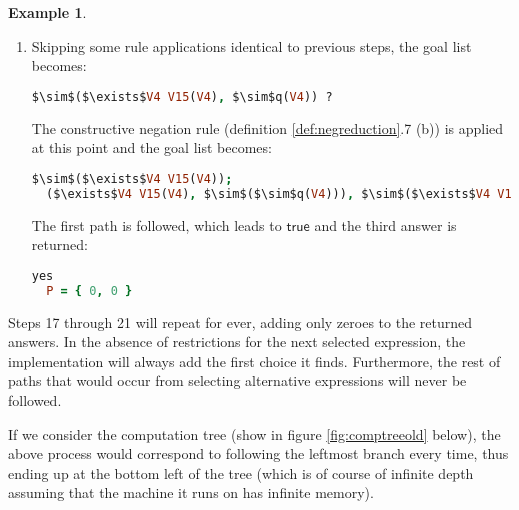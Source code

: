 \documentclass[inscr,ack,preface]{dithesis}
\theoremstyle{definition}
\newtheorem{example}{Example}[chapter]
\newcommand{\msf}[1]{$\mathsf{#1}$}
\begin{document}
\begin{example}
\begin{enumerate}
\item Skipping some rule applications identical to previous steps, the goal list becomes:
\begin{lstlisting}[language=Prolog,%
  frame=single,breaklines=false,mathescape=true]
$\sim$($\exists$V4 V15(V4), $\sim$q(V4)) ?
\end{lstlisting}

The constructive negation rule (definition \ref{def:negreduction}.7 (b)) is applied at this point and the goal list becomes:
\begin{lstlisting}[language=Prolog,%
  frame=single,breaklines=false,mathescape=true]
  $\sim$($\exists$V4 V15(V4));
  ($\exists$V4 V15(V4), $\sim$($\sim$q(V4))), $\sim$($\exists$V4 V15(V4), $\sim$q(V4)) ?
\end{lstlisting}

The first path is followed, which leads to \msf{true} and the third answer is returned:
\begin{lstlisting}[language=Prolog,%
  frame=single,breaklines=false,mathescape=true]
  yes
  P = { 0, 0 }
\end{lstlisting}
\end{enumerate}

Steps 17 through 21 will repeat for ever, adding only zeroes to the returned answers. In the absence of restrictions for the next selected expression, the implementation will always add the first choice it finds. Furthermore, the rest of paths that would occur from selecting alternative expressions will never be followed.

If we consider the computation tree (show in figure \ref{fig:comptreeold} below), the above process would correspond to following the leftmost branch every time, thus ending up at the bottom left of the tree (which is of course of infinite depth assuming that the machine it runs on has infinite memory).



\end{example}
\end{document}
